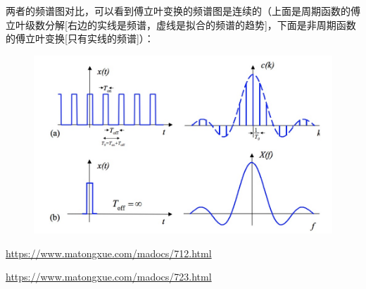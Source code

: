 \documentclass[12pt]{article}
\begin{document}
两者的频谱图对比，可以看到傅立叶变换的频谱图是连续的（上面是周期函数的傅立叶级数分解[右边的实线是频谱，虚线是拟合的频谱的趋势]，下面是非周期函数的傅立叶变换[只有实线的频谱]）：
\begin{figure}[H]
  \centering
  \includegraphics[width=.8\textwidth]{fig/ft_continuous_compare.png} 
\end{figure}




\url{https://www.matongxue.com/madocs/712.html}

\url{https://www.matongxue.com/madocs/723.html}



\end{document}
